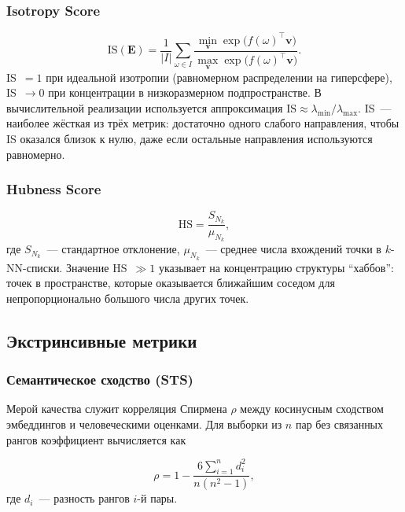 \subsubsection{Isotropy Score}

\begin{equation*}
  \mathrm{IS}(\mathbf{E}) = \frac{1}{|I|}
  \sum_{\omega \in I}
  \frac{
    \min_{\mathbf{v}} \exp\!\bigl(f(\omega)^{\top}\mathbf{v}\bigr)
  }{
    \max_{\mathbf{v}} \exp\!\bigl(f(\omega)^{\top}\mathbf{v}\bigr)
  }.
\end{equation*}
IS~$= 1$ при идеальной изотропии (равномерном распределении на гиперсфере),
IS~$\to 0$ при концентрации в низкоразмерном подпространстве.
В вычислительной реализации используется аппроксимация
$\mathrm{IS} \approx \lambda_{\min} / \lambda_{\max}$.
IS~--- наиболее жёсткая из трёх метрик: достаточно одного слабого
направления, чтобы IS оказался близок к нулю, даже если остальные
направления используются равномерно.

\subsubsection{Hubness Score}

\begin{equation*}
  \mathrm{HS} = \frac{S_{N_k}}{\mu_{N_k}},
\end{equation*}
где $S_{N_k}$~--- стандартное отклонение, $\mu_{N_k}$~--- среднее числа
вхождений точки в $k$-NN-списки. Значение HS~$\gg 1$ указывает на
концентрацию структуры \enquote{хаббов}: точек в пространстве,
которые оказывается ближайшим соседом для непропорционально большого
числа других точек.

\subsection{Экстринсивные метрики}
\label{ssec:extrinsic}

\subsubsection{Семантическое сходство (STS)}

Мерой качества служит корреляция Спирмена $\rho$ между косинусным сходством
эмбеддингов и человеческими оценками. Для выборки из $n$ пар без связанных
рангов коэффициент вычисляется как

\begin{equation*}
  \rho = 1 - \frac{6\sum_{i=1}^{n} d_i^2}{n(n^2 - 1)},
\end{equation*}
где $d_i$~--- разность рангов $i$-й пары.

